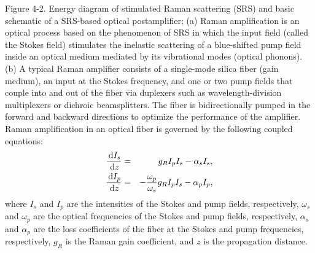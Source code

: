 Figure 4-2.  Energy diagram of stimulated Raman scattering (SRS) and basic schematic of a SRS-based optical postamplifier; (a) Raman amplification is an optical process based on the phenomenon of SRS in which the input field (called the Stokes field) stimulates the inelastic scattering of a blue-shifted pump field inside an optical medium mediated by its vibrational modes (optical phonons). (b) A typical Raman amplifier consists of a single-mode silica fiber (gain medium), an input at the Stokes frequency, and one or two pump fields that couple into and out of the fiber via duplexers such as wavelength-division multiplexers or dichroic beamsplitters. The fiber is bidirectionally pumped in the forward and backward directions to optimize the performance of the amplifier.
Raman amplification in an optical fiber is governed by the following coupled equations:
\begin{eqnarray}
\frac{\,\mathrm{d} I_s}{\,\mathrm{d} z} &=& g_R I_p I_s - \alpha_s I_s,\\
\frac{\,\mathrm{d} I_p}{\,\mathrm{d} z} &=& -\frac{\omega_p}{\omega_s} g_R I_p I_s- \alpha_p I_p,
\end{eqnarray}
where $I_s$ and $I_p$ are the intensities of the Stokes and pump fields, respectively, $\omega_s$ and $\omega_p$ are the optical frequencies of the Stokes and pump fields, respectively, $\alpha_s$ and $\alpha_p$ are the loss coefficients of the fiber at the Stokes and pump frequencies, respectively, $g_R$ is the Raman gain coefficient, and $z$ is the propagation distance.

